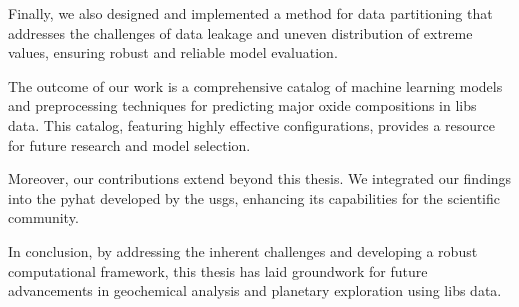 Finally, we also designed and implemented a method for data partitioning that addresses the challenges of data leakage and uneven distribution of extreme values, ensuring robust and reliable model evaluation.

The outcome of our work is a comprehensive catalog of machine learning models and preprocessing techniques for predicting major oxide compositions in \gls{libs} data.
This catalog, featuring highly effective configurations, provides a resource for future research and model selection.

Moreover, our contributions extend beyond this thesis.
We integrated our findings into the \gls{pyhat} developed by the \gls{usgs}, enhancing its capabilities for the scientific community.

In conclusion, by addressing the inherent challenges and developing a robust computational framework, this thesis has laid groundwork for future advancements in geochemical analysis and planetary exploration using \gls{libs} data.
